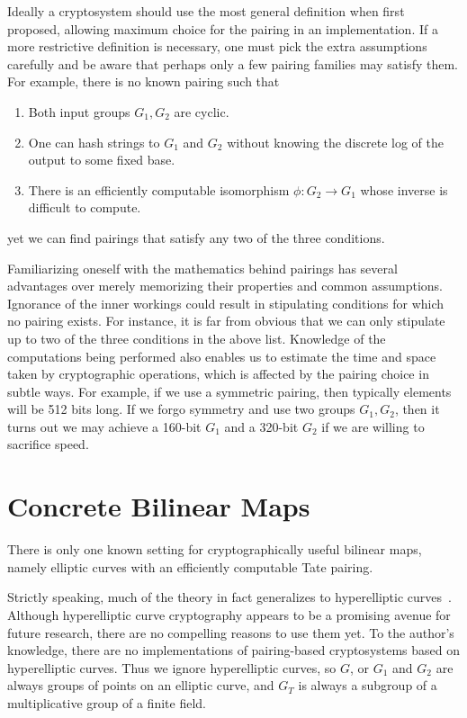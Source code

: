 Ideally a cryptosystem should use the most general definition when first
proposed, allowing maximum choice for the pairing in an implementation. If a
more restrictive definition is necessary, one must pick the extra assumptions
carefully and be aware that perhaps only a few pairing families may satisfy
them. For example, there is no known pairing such that
\begin{enumerate}
\item Both input groups $G_1, G_2$ are cyclic.
\item One can hash strings to $G_1$ and $G_2$ without knowing the
discrete log of the output to some fixed base.
\item There is an efficiently computable isomorphism $\phi:G_2\rightarrow G_1$
whose inverse is difficult to compute.
\end{enumerate}
yet we can find pairings that satisfy any two of the three conditions.

Familiarizing oneself with the mathematics behind pairings has several
advantages over merely memorizing their properties and common assumptions.
Ignorance of the inner workings could result in stipulating conditions for
which no pairing exists. For instance, it is far from obvious that
we can only stipulate up to two of the three conditions in the above list.
Knowledge of the computations being performed also enables us to estimate the
time and space taken by cryptographic operations, which is affected by the
pairing choice in subtle ways. For example, if we use a symmetric pairing, then
typically elements will be 512 bits long. If we forgo symmetry and use two
groups $G_1, G_2$, then it turns out we may achieve a 160-bit $G_1$ and a
320-bit $G_2$ if we are willing to sacrifice speed.

\section{Concrete Bilinear Maps}

There is only one known setting for cryptographically useful bilinear maps,
namely elliptic curves with an efficiently computable Tate pairing.

Strictly speaking, much of the theory in fact generalizes to hyperelliptic
curves~\cite{galbraith,rubinsilverberg,freemanhyper}. Although hyperelliptic
curve cryptography appears to be a promising avenue for future research, there
are no compelling reasons to use them yet. To the author's knowledge, there are
no implementations of pairing-based cryptosystems based on hyperelliptic
curves. Thus we ignore hyperelliptic curves, so $G$, or $G_1$ and $G_2$ are
always groups of points on an elliptic curve, and $G_T$ is always a subgroup of
a multiplicative group of a finite field.

